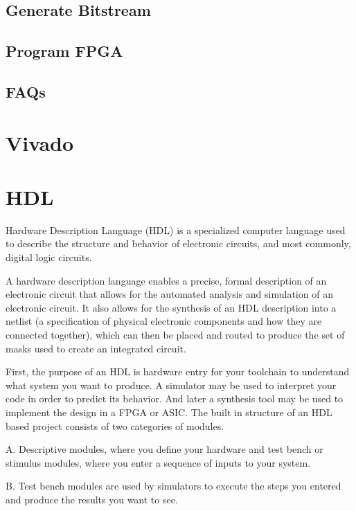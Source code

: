 \subsection{Generate Bitstream}
\subsection{Program FPGA}
\subsection{FAQs}


\section{Vivado} 




\section{HDL} Hardware Description Language (HDL) is a specialized computer language used to describe the structure and behavior of electronic circuits, and most commonly, digital logic circuits.

A hardware description language enables a precise, formal description of an electronic circuit that allows for the automated analysis and simulation of an electronic circuit. It also allows for the synthesis of an HDL description into a netlist (a specification of physical electronic components and how they are connected together), which can then be placed and routed to produce the set of masks used to create an integrated circuit.

First, the purpose of an HDL is hardware entry for your toolchain to understand what system you want to produce. A simulator may be used to interpret your code in order to predict its behavior. And later a synthesis tool may be used to implement the design in a FPGA or ASIC. The built in structure of an HDL based project consists of two categories of modules. 

A. Descriptive modules, where you define your hardware and test bench or stimulus modules, where you enter a sequence of inputs to your system. 

B. Test bench modules are used by simulators to execute the steps you entered and produce the results you want to see.

